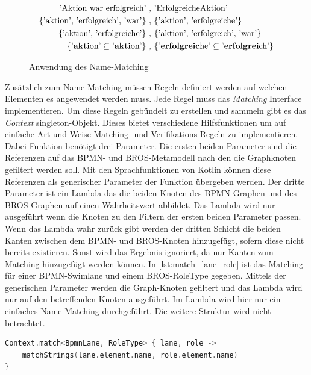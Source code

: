 \begin{figure}
    \begin{align}
        \text{'Aktion war erfolgreich'}\ ,&\ \text{'ErfolgreicheAktion'} \label{eq:name_matching_1}\\
        \text{\{'aktion', 'erfolgreich', 'war'\}}\ ,&\ \text{\{'aktion', 'erfolgreiche'\}} \label{eq:name_matching_2}\\
        \text{\{'aktion', 'erfolgreiche'\}}\ ,&\ \text{\{'aktion', 'erfolgreich', 'war'\}} \label{eq:name_matching_3}\\
        \text{\{'\textbf{akti}on'} \subseteq \text{'\textbf{akti}on'\}}\ ,&\ \text{\{'\textbf{erfolgreic}he'} \subseteq \text{'\textbf{erfolgrei}ch'\}} \label{eq:name_matching_4}
    \end{align}
    \caption{Anwendung des Name-Matching}
    \label{eq:name_matching}
\end{figure}

Zusätzlich zum Name-Matching müssen Regeln definiert werden auf welchen Elementen es angewendet werden muss.
Jede Regel muss das \emph{Matching} Interface implementieren.
Um diese Regeln gebündelt zu erstellen und sammeln gibt es das \emph{Context} singleton-Objekt.
Dieses bietet verschiedene Hilfsfunktionen um auf einfache Art und Weise Matching- und Verifikations-Regeln zu implementieren.
Dabei Funktion benötigt drei Parameter.
Die ersten beiden Parameter sind die Referenzen auf das BPMN- und BROS-Metamodell nach den die Graphknoten gefiltert werden soll.
Mit den Sprachfunktionen von Kotlin können diese Referenzen als generischer Parameter der Funktion übergeben werden.
Der dritte Parameter ist ein Lambda das die beiden Knoten des BPMN-Graphen und des BROS-Graphen auf einen Wahrheitswert abbildet.
Das Lambda wird nur ausgeführt wenn die Knoten zu den Filtern der ersten beiden Parameter passen.
Wenn das Lambda wahr zurück gibt werden der dritten Schicht die beiden Kanten zwischen dem BPMN- und BROS-Knoten hinzugefügt, sofern diese nicht bereits existieren.
Sonst wird das Ergebnis ignoriert, da nur Kanten zum Matching hinzugefügt werden können.
In \cref{lst:match_lane_role} ist das Matching für einer BPMN-Swimlane und einem BROS-RoleType gegeben.
Mittels der generischen Parameter werden die Graph-Knoten gefiltert und das Lambda wird nur auf den betreffenden Knoten ausgeführt. 
Im Lambda wird hier nur ein einfaches Name-Matching durchgeführt.
Die weitere Struktur wird nicht betrachtet.

\begin{lstlisting}[language=Kotlin, caption=Matching Regel von einer BPMN-SwimLane und einem BROS-RoleType, label=lst:match_lane_role]
Context.match<BpmnLane, RoleType> { lane, role ->
    matchStrings(lane.element.name, role.element.name)
}
\end{lstlisting}


